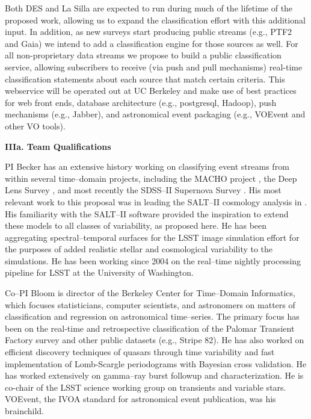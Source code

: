 Both DES and La Silla are expected to run during much of the lifetime of the proposed work, allowing us to expand the classification effort with this additional input. In addition, as new surveys start producing public streams (e.g., PTF2 and Gaia) we intend to add a classification engine for those sources as well.  For all non-proprietary data streams we propose to build a public classification service, allowing subscribers to receive (via push and pull mechanisms) real-time classification statements about each source that match certain criteria. This webservice will be operated out at UC Berkeley and make use of best practices for web front ends, database architecture (e.g., postgresql, Hadoop), push mechanisms (e.g., Jabber), and astronomical event packaging (e.g., VOEvent and other VO tools).

\bigskip \centerline{\bf IIIa. Team Qualifications} \smallskip

 \smallskip

PI Becker has an extensive history working on classifying event streams from
within several time--domain projects, including the MACHO project
\citep{2000PhDT.......258B}, the Deep Lens Survey \citep{2004ApJ...611..418B},
and most recently the SDSS--II Supernova Survey
\citep{2008AJ....135..338F,2008AJ....135..348S}.  His most relevant work to this
proposal was in leading the SALT--II cosmology analysis in
\cite{2009ApJS..185...32K}.  His familiarity with the SALT--II software provided
the inspiration to extend these models to all classes of variability, as
proposed here. He has been aggregating spectral--temporal surfaces for the LSST
image simulation effort \citep{2010SPIE.7738E..53C} for the purposes of added
realistic stellar and cosmological variability to the simulations.  He has been
working since 2004 on the real--time nightly processing pipeline for LSST at the
University of Washington.

 \smallskip

Co--PI Bloom is director of the Berkeley Center for Time--Domain Informatics,
which focuses statisticians, computer scientists, and astronomers on matters of
classification and regression on astronomical time--series.  The primary focus
has been on the real-time and retrospective classification of the Palomar
Transient Factory survey and other public datasets (e.g., Stripe 82). He has
also worked on efficient discovery techniques of quasars through time
variability and fast implementation of Lomb-Scargle periodograms with Bayesian
cross validation. He has worked extensively on gamma--ray burst followup and
characterization. He is co-chair of the LSST science working group on transients and variable stars. VOEvent, the IVOA standard for astronomical event publication, was his brainchild.


